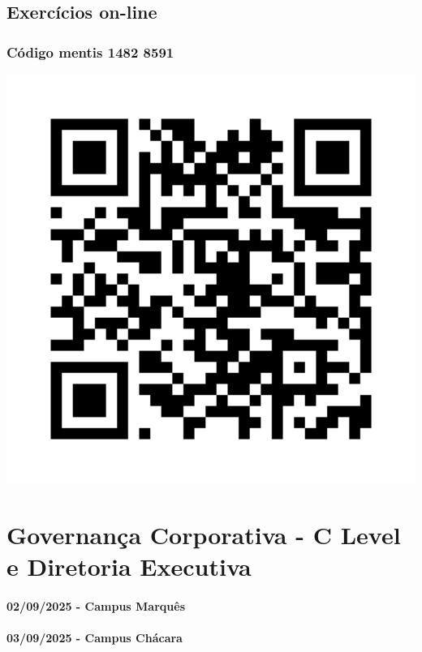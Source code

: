 \documentclass[
]{book}
\begin{document}
\section{Exercícios on-line}\label{exercuxedcios-on-line}

\subsection{Código mentis 1482 8591}\label{cuxf3digo-mentis-1482-8591}

\includegraphics[width=7.41667in,height=\textheight]{images/04-2025-08-26_27/exercicios-aula-04.png}

\chapter{Governança Corporativa - C Level e Diretoria Executiva}\label{governanuxe7a-corporativa---c-level-e-diretoria-executiva}

\subsubsection*{02/09/2025 - Campus Marquês}\label{campus-marquuxeas-4}

\subsubsection*{03/09/2025 - Campus Chácara}\label{campus-chuxe1cara-4}
\end{document}
